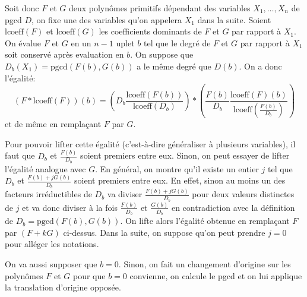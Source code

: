 \documentclass[a4paper,11pt]{article}
\begin{document}
Soit donc $F$ et $G$ deux polynômes primitifs dépendant des variables $X_1,
\ldots, X_n$ de pgcd $D$, on fixe une des variables qu'on appelera $X_1$ dans
la suite. Soient $\mbox{lcoeff} ( F )$ et $\mbox{lcoeff} ( G )$ les
coefficients dominants de $F$ et $G$ par rapport à $X_1$. On évalue $F$ et $G$
en un $n - 1$ uplet $b$ tel que le degré de $F$ et $G$ par rapport à $X_1$
soit conservé après evaluation en $b$. On suppose que $D_b ( X_1 ) =
\mbox{pgcd} ( F ( b ), G ( b ))$ a le même degré que $D ( b )$. On a donc
l'égalité:
\[ ( F \ast \mbox{lcoeff} ( F )) ( b ) = \left( D_b  \frac{\mbox{lcoeff} ( F (
   b ))}{\mbox{lcoeff} ( D_b )} \right) \ast \left( \frac{F ( b )}{D_b} 
   \frac{\mbox{lcoeff} ( F ) ( b )}{\mbox{lcoeff} ( \frac{F ( b )}{D_b} )}
   \right) \]
et de même en remplaçant $F$ par $G$.

Pour pouvoir lifter cette égalité (c'est-à-dire généraliser à plusieurs 
variables), il faut que $D_b$ et $\frac{F ( b )}{D_b}$
soient premiers entre eux. Sinon, on peut essayer de lifter l'égalité analogue
avec $G$. En général, on montre qu'il existe un entier $j$ tel que $D_b$ et
$\frac{F ( b ) + j G ( b )}{D_b}$ soient premiers entre eux. En effet, sinon
au moins un des facteurs irréductibles de $D_b$ va diviser $\frac{F ( b ) + j
G ( b )}{D_b}$ pour deux valeurs distinctes de $j$ et va donc diviser à la
fois $\frac{F ( b )}{D_b}$ et $\frac{G ( b )}{D_b}$ en contradiction avec la
définition de $D_b = \mbox{pgcd} ( F ( b ), G ( b ))$.  On lifte alors
l'égalité obtenue en remplaçant $F$ par $( F + k G )$ ci-dessus. Dans la
suite, on suppose qu'on peut prendre $j = 0$ pour alléger les notations.

On va aussi supposer que $b = 0$. Sinon, on fait un changement d'origine sur
les polynômes $F$ et $G$ pour que $b = 0$ convienne, on calcule le pgcd et on
lui applique la translation d'origine opposée.
\end{document}
